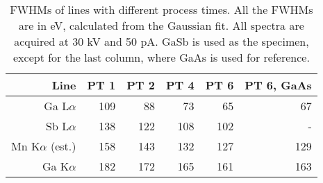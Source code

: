 \begin{table}[phtb]
    \begin{center}
        \caption{
            FWHMs of lines with different process times.
            All the FWHMs are in eV, calculated from the Gaussian fit.
            All spectra are acquired at 30 kV and 50 pA.
            GaSb is used as the specimen, except for the last column, where GaAs is used for reference.
        }
        \renewcommand*{\arraystretch}{1.4}
        \label{tab:results:PTvsFWHMs}
        \begin{tabular}{rrrrrr}
            \hline
            \textbf{Line}       & \textbf{PT 1} & \textbf{PT 2} & \textbf{PT 4} & \textbf{PT 6} & \textbf{PT 6, GaAs} \\
            \hline
            Ga L$\alpha$        & 109           & 88            & 73            & 65            & 67                  \\
            Sb L$\alpha$        & 138           & 122           & 108           & 102           & -                   \\
            Mn K$\alpha$ (est.) & 158           & 143           & 132           & 127           & 129                 \\
            Ga K$\alpha$        & 182           & 172           & 165           & 161           & 163                 \\
            \hline
        \end{tabular}
    \end{center}
\end{table}
